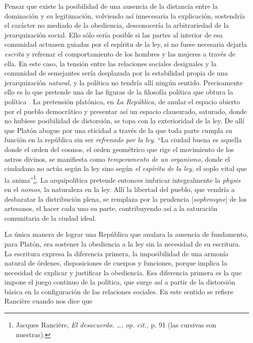 Pensar que existe la posibilidad de una ausencia de la distancia entre la dominación y su legitimación, volviendo así innecesaria la explicación, sostendría el carácter no mediado de la obediencia, desconocería la arbitrariedad de la jerarquización social. Ello sólo sería posible si las partes al interior de esa comunidad actuasen guiadas por el espíritu de la ley, si no fuese necesaria dejarla \emph{escrita} y refrenar el comportamiento de los hombres y las mujeres a través de ella. En este caso, la tensión entre las relaciones sociales desiguales y la comunidad de semejantes sería desplazada por la estabilidad propia de una jerarquización \emph{natural,} y la política no tendría allí ningún sentido. Precisamente ello es lo que pretende una de las figuras de la filosofía política que obtura la política . La pretensión platónica, en \emph{La República,} de anular el espacio abierto por el pueblo democrático y presentar así un espacio clausurado, saturado, donde no hubiese posibilidad de distorsión, se topa con la exterioridad de la ley. De allí que Platón abogue por una eticidad a través de la que toda parte cumpla su función en la república sin ser \emph{refrenado por la ley}. \enquote{La ciudad buena es aquella donde el orden del cosmos, el orden geométrico que rige el movimiento de los astros divinos, se manifiesta como \emph{temperamento de un organismo,} donde el ciudadano no actúa según la ley sino según \emph{el espíritu de la ley,} el soplo vital que la anima}\footnote{Jacques Rancière, \emph{El desacuerdo. \ldots{}}, \emph{op. cit.,} p. 91 (las cursivas son nuestras).}. La arquipolítica pretende entonces imbricar integralmente la \emph{physis} en el \emph{nomos,} la naturaleza en la ley. Allí la libertad del pueblo, que vendría a desbaratar la distribución plena, se remplaza por la prudencia {[}\emph{sophrosyne}{]} de los artesanos, el hacer cada uno su parte, contribuyendo así a la saturación comunitaria de la ciudad ideal.

La única manera de lograr una República que anulara la ausencia de fundamento, para Platón, era sostener la obediencia a la ley sin la necesidad de su escritura. La escritura expresa la diferencia primera, la imposibilidad de una armonía natural de órdenes, disposiciones de cuerpos y funciones, porque implica la necesidad de explicar y justificar la obediencia. Esa diferencia primera es la que impone el juego continuo de la política, que surge así a partir de la distorsión básica en la configuración de las relaciones sociales. En este sentido se refiere Rancière cuando nos dice que

